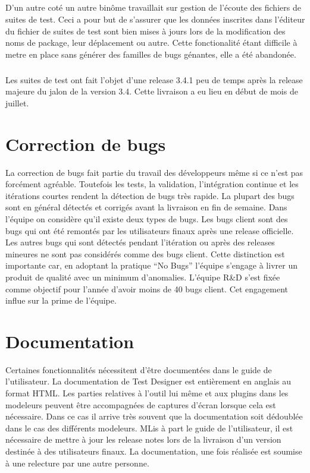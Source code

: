 \subparagraph*{}
D'un autre coté un autre binôme travaillait sur gestion de l'écoute des fichiers de suites de test. Ceci a pour but de s'assurer que les données inscrites dans l'éditeur du fichier de suites de test sont bien mises à jours lors de la modification des noms de package, leur déplacement ou autre. Cette fonctionalité étant difficile à metre en place sans générer des familles de bugs génantes, elle a été abandonée.

\subparagraph*{}
Les suites de test ont fait l'objet d'une release 3.4.1 peu de temps après la release majeure du jalon de la version 3.4. Cette livraison a eu lieu en début de mois de juillet.




\section{Correction de bugs}
La correction de bugs fait partie du travail des développeurs même si ce n'est pas forcément agréable. Toutefois les tests, la validation, l'intégration continue et les itérations courtes rendent la détection de bugs très rapide. La plupart des bugs sont en général détectés et corrigés avant la livraison en fin de semaine. Dans l'équipe on considère qu'il existe deux types de bugs. Les bugs client sont des bugs qui ont été remontés par les utilisateurs finaux après une release officielle. Les autres bugs qui sont détectés pendant l'itération ou après des releases mineures ne sont pas considérés comme des bugs client. Cette distinction est importante car, en adoptant la pratique ``No Bugs'' l'équipe s'engage à livrer un produit de qualité avec un minimum d'anomalies. L'équipe R\&D s'est fixée comme objectif pour l'année d'avoir moins de 40 bugs client. Cet engagement influe sur la prime de l'équipe.

\section{Documentation}
Certaines fonctionnalités nécessitent d'être documentées dans le guide de l'utilisateur. La documentation de Test Designer est entièrement en anglais au format HTML. Les parties relatives à l'outil lui même et aux plugins dans les modeleurs peuvent être accompagnées de captures d'écran lorsque cela est nécessaire. Dans ce cas il arrive très souvent que la documentation soit dédoublée dans le cas des différents modeleurs. MLis à part le guide de l'utilisateur, il est nécessaire de mettre à jour les release notes lors de la livraison d'un version destinée à des utilisateurs finaux. La documentation, une fois réalisée est soumise à une relecture par une autre personne.


